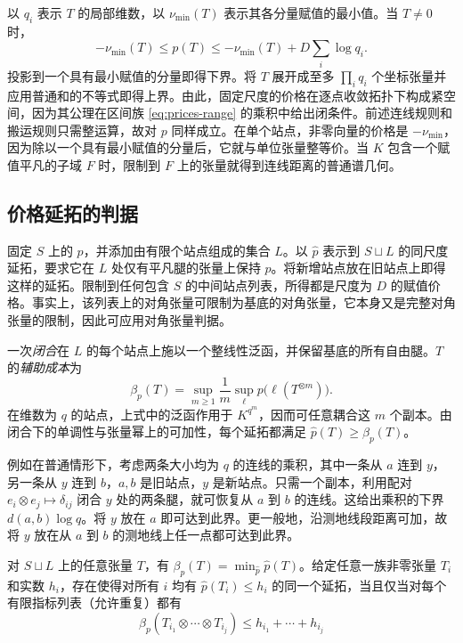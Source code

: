 以 \(q_i\) 表示 \(T\) 的局部维数，以 \(\nu_{\min}(T)\) 表示其各分量赋值的最小值。当 \(T\ne0\) 时，
\begin{equation}\label{eq:prices-range}
 -\nu_{\min}(T)\le p(T)\le -\nu_{\min}(T)+D\sum_i\log q_i.
\end{equation}
投影到一个具有最小赋值的分量即得下界。将 \(T\) 展开成至多 \(\prod_iq_i\) 个坐标张量并应用普通和的不等式即得上界。由此，固定尺度的价格在逐点收敛拓扑下构成紧空间，因为其公理在区间族 \eqref{eq:prices-range} 的乘积中给出闭条件。前述连线规则和搬运规则只需整运算，故对 \(p\) 同样成立。在单个站点，非零向量的价格是 \(-\nu_{\min}\)，因为除以一个具有最小赋值的分量后，它就与单位张量整等价。当 \(K\) 包含一个赋值平凡的子域 \(F\) 时，限制到 \(F\) 上的张量就得到连线距离的普通谱几何。

\subsection{价格延拓的判据}
固定 \(S\) 上的 \(p\)，并添加由有限个站点组成的集合 \(L\)。以 \(\widehat p\) 表示到 \(S\sqcup L\) 的同尺度延拓，要求它在 \(L\) 处仅有平凡腿的张量上保持 \(p\)。将新增站点放在旧站点上即得这样的延拓。限制到任何包含 \(S\) 的中间站点列表，所得都是尺度为 \(D\) 的赋值价格。事实上，该列表上的对角张量可限制为基底的对角张量，它本身又是完整对角张量的限制，因此可应用对角张量判据。

一次\emph{闭合}在 \(L\) 的每个站点上施以一个整线性泛函，并保留基底的所有自由腿。\(T\) 的\emph{辅助成本}为
\begin{equation}\label{eq:prices-beta}
 \beta_p(T)=\sup_{m\ge1}\frac1m
       \sup_{\ell}p\bigl(\ell(T^{\otimes m})\bigr).
\end{equation}
在维数为 \(q\) 的站点，上式中的泛函作用于 \(K^{q^m}\)，因而可任意耦合这 \(m\) 个副本。由闭合下的单调性与张量幂上的可加性，每个延拓都满足 \(\widehat p(T)\ge\beta_p(T)\)。

例如在普通情形下，考虑两条大小均为 \(q\) 的连线的乘积，其中一条从 \(a\) 连到 \(y\)，另一条从 \(y\) 连到 \(b\)，\(a,b\) 是旧站点，\(y\) 是新站点。只需一个副本，利用配对 \(e_i\otimes e_j\mapsto\delta_{ij}\) 闭合 \(y\) 处的两条腿，就可恢复从 \(a\) 到 \(b\) 的连线。这给出乘积的下界 \(d(a,b)\log q\)。将 \(y\) 放在 \(a\) 即可达到此界。更一般地，沿测地线段距离可加，故将 \(y\) 放在从 \(a\) 到 \(b\) 的测地线上任一点都可达到此界。

\begin{theorem}[价格延拓]\label{thm:extension}
对 \(S\sqcup L\) 上的任意张量 \(T\)，有 \(\beta_p(T)=\min_{\widehat p}\widehat p(T)\)。给定任意一族非零张量 \(T_i\) 和实数 \(h_i\)，存在使得对所有 \(i\) 均有 \(\widehat p(T_i)\le h_i\) 的同一个延拓，当且仅当对每个有限指标列表（允许重复）都有
\begin{equation}\label{eq:prices-product-test}
 \beta_p(T_{i_1}\otimes\cdots\otimes T_{i_j})
 \le h_{i_1}+\cdots+h_{i_j}
\end{equation}
\end{theorem}

